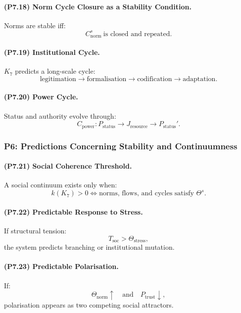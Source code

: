\paragraph{(P7.18) Norm Cycle Closure as a Stability Condition.}
Norms are stable iff:
\[
C_{\mathrm{norm}}^s \ \text{is closed and repeated}.
\]

\paragraph{(P7.19) Institutional Cycle.}
$K_7$ predicts a long-scale cycle:
\[
\text{legitimation} \to \text{formalisation} \to \text{codification} \to \text{adaptation}.
\]

\paragraph{(P7.20) Power Cycle.}
Status and authority evolve through:
\[
C_{\mathrm{power}}: P_{\mathrm{status}} \to J_{\mathrm{resource}} \to P_{\mathrm{status}}'.
\]

\subsubsection{P6: Predictions Concerning Stability and Continuumness}

\paragraph{(P7.21) Social Coherence Threshold.}
A social continuum exists only when:
\[
k(K_7) > 0
\iff
\text{norms, flows, and cycles satisfy } \Theta^s.
\]

\paragraph{(P7.22) Predictable Response to Stress.}
If structural tension:
\[
T_{\mathrm{soc}} > \Theta_{\mathrm{stress}},
\]
the system predicts branching or institutional mutation.

\paragraph{(P7.23) Predictable Polarisation.}
If:
\[
\Theta_{\mathrm{norm}} \uparrow \quad \text{and} \quad P_{\mathrm{trust}} \downarrow,
\]
polarisation appears as two competing social attractors.


